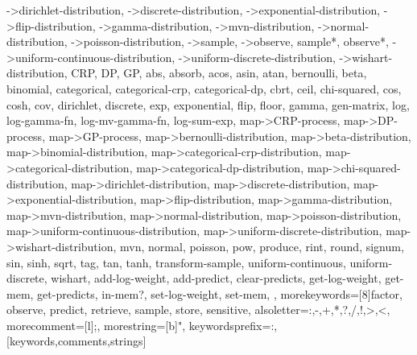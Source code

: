 {{    ->dirichlet-distribution, ->discrete-distribution, %
    ->exponential-distribution, ->flip-distribution, ->gamma-distribution, %
    ->mvn-distribution, ->normal-distribution, ->poisson-distribution, %
    ->sample, ->observe, sample*, observe*, %
    ->uniform-continuous-distribution, ->uniform-discrete-distribution, %
    ->wishart-distribution, CRP, DP, GP, abs, absorb, acos, asin, atan, %
    bernoulli, beta, binomial, categorical, categorical-crp, categorical-dp, %
    cbrt, ceil, chi-squared, cos, cosh, cov, dirichlet, discrete, exp, %
    exponential, flip, floor, gamma, gen-matrix, log, log-gamma-fn, %
    log-mv-gamma-fn, log-sum-exp, map->CRP-process, map->DP-process, %
    map->GP-process, map->bernoulli-distribution, map->beta-distribution, %
    map->binomial-distribution, map->categorical-crp-distribution, %
    map->categorical-distribution, map->categorical-dp-distribution, %
    map->chi-squared-distribution, map->dirichlet-distribution, %
    map->discrete-distribution, map->exponential-distribution, %
    map->flip-distribution, map->gamma-distribution, map->mvn-distribution, %
    map->normal-distribution, map->poisson-distribution, %
    map->uniform-continuous-distribution, map->uniform-discrete-distribution, %
    map->wishart-distribution, mvn, normal, poisson, pow, produce, %
    rint, round, signum, sin, sinh, sqrt, tag, tan, tanh, transform-sample, %
    uniform-continuous, uniform-discrete, wishart, %
    add-log-weight, add-predict, clear-predicts, get-log-weight, %
    get-mem, get-predicts, in-mem?, set-log-weight, set-mem, %
  }, %
  morekeywords=[8]{factor, observe, predict, retrieve, sample, store}, %
  sensitive, %
  alsoletter={:,-,+,*,?,/,!,>,<}, %
  morecomment=[l];, %
  morestring=[b]", %
  keywordsprefix=:, %
}[keywords,comments,strings]
 
